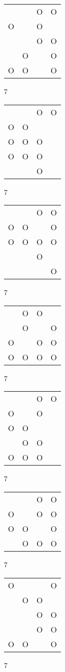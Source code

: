 \begin{tabular}{|m{0.2cm}m{0.2cm}m{0.2cm}m{0.2cm}|}\hline
 & &O&O\\
O& &O& \\
 & &O&O\\
 &O& &O\\
O&O& &O\\
\hline\end{tabular}7
\begin{tabular}{|m{0.2cm}m{0.2cm}m{0.2cm}m{0.2cm}|}\hline
 & &O&O\\
O&O& & \\
O&O&O& \\
O&O&O& \\
 & &O& \\
\hline\end{tabular}7
\begin{tabular}{|m{0.2cm}m{0.2cm}m{0.2cm}m{0.2cm}|}\hline
 & &O&O\\
O&O& &O\\
O&O&O&O\\
 & &O& \\
 & & &O\\
\hline\end{tabular}7
\begin{tabular}{|m{0.2cm}m{0.2cm}m{0.2cm}m{0.2cm}|}\hline
 &O&O& \\
 &O& &O\\
O& &O&O\\
O&O&O&O\\
\hline\end{tabular}7
\begin{tabular}{|m{0.2cm}m{0.2cm}m{0.2cm}m{0.2cm}|}\hline
 & &O&O\\
O& &O& \\
O&O& & \\
 &O&O& \\
O&O&O& \\
\hline\end{tabular}7
\begin{tabular}{|m{0.2cm}m{0.2cm}m{0.2cm}m{0.2cm}|}\hline
 & &O&O\\
O& &O&O\\
O&O& &O\\
 &O&O&O\\
\hline\end{tabular}7
\begin{tabular}{|m{0.2cm}m{0.2cm}m{0.2cm}m{0.2cm}|}\hline
O& & &O\\
 &O&O& \\
 & &O&O\\
 & &O&O\\
O&O& &O\\
\hline\end{tabular}7
